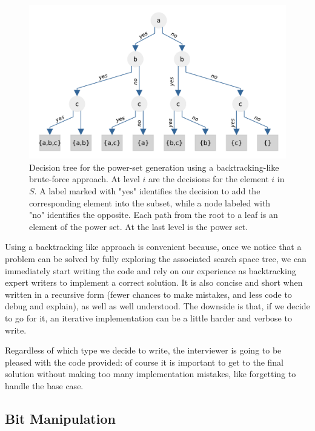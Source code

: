 \begin{figure}
    \centering
    \includegraphics[width=\textwidth]{sources/power_set/images/tree}
    \caption[Decision tree for the power-set generation using backtracking.]{Decision tree for the power-set generation using a backtracking-like brute-force approach. At level $i$ are the decisions for the element $i$ in $S$. A label marked with "yes" identifies the decision to add the corresponding element into the subset, while a node labeled with "no" identifies the opposite. Each path from the root to a leaf is an element of the power set. At the last level is the power set.}
    \label{ref:power_set_decision_trees}
\end{figure}

Using a backtracking like approach is convenient because, once we notice
that a problem can be solved by fully exploring the associated search space tree, we can immediately
start writing the code and rely on our experience as backtracking expert writers to implement a correct
solution. It is also concise and short when written in a recursive  form (fewer chances to make mistakes, and less code to debug and explain),  as well
as well understood.
The downside is that, if we decide to go for it, an iterative implementation can be a little harder and verbose to write.

Regardless of which type we decide to write, the interviewer is going to be pleased with the code provided: of course it is important to get to the final solution
without making too many implementation mistakes, like forgetting to handle the base case.


\subsection{Bit Manipulation}

